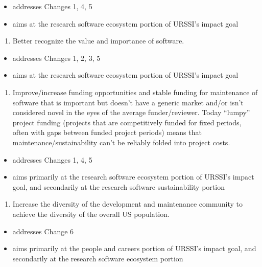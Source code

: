 \documentclass[
]{book}
\providecommand{\tightlist}{%
  \setlength{\itemsep}{0pt}\setlength{\parskip}{0pt}}
\begin{document}
\begin{itemize}
\tightlist
\item
  addresses Changes 1, 4, 5
\item
  aims at the research software ecosystem portion of URSSI's impact goal
\end{itemize}

\begin{enumerate}
\def\labelenumi{\arabic{enumi}.}
\setcounter{enumi}{4}
\tightlist
\item
  Better recognize the value and importance of software.
\end{enumerate}

\begin{itemize}
\tightlist
\item
  addresses Changes 1, 2, 3, 5
\item
  aims at the research software ecosystem portion of URSSI's impact goal
\end{itemize}

\begin{enumerate}
\def\labelenumi{\arabic{enumi}.}
\setcounter{enumi}{5}
\tightlist
\item
  Improve/increase funding opportunities and stable funding for maintenance of software that
  is important but doesn't have a generic market and/or isn't considered novel in the eyes of the
  average funder/reviewer. Today ``lumpy'' project funding (projects that are
  competitively funded for fixed periods, often with gaps between funded project periods) means
  that maintenance/sustainability can't be reliably folded into project costs.
\end{enumerate}

\begin{itemize}
\tightlist
\item
  addresses Changes 1, 4, 5
\item
  aims primarily at the research software ecosystem portion of URSSI's impact goal, and secondarily at the research software sustainability portion
\end{itemize}

\begin{enumerate}
\def\labelenumi{\arabic{enumi}.}
\setcounter{enumi}{6}
\tightlist
\item
  Increase the diversity of the development and maintenance community to achieve the diversity of the overall US population.
\end{enumerate}

\begin{itemize}
\tightlist
\item
  addresses Change 6
\item
  aims primarily at the people and careers portion of URSSI's impact goal, and secondarily at the research software ecosystem portion
\end{itemize}
\end{document}
